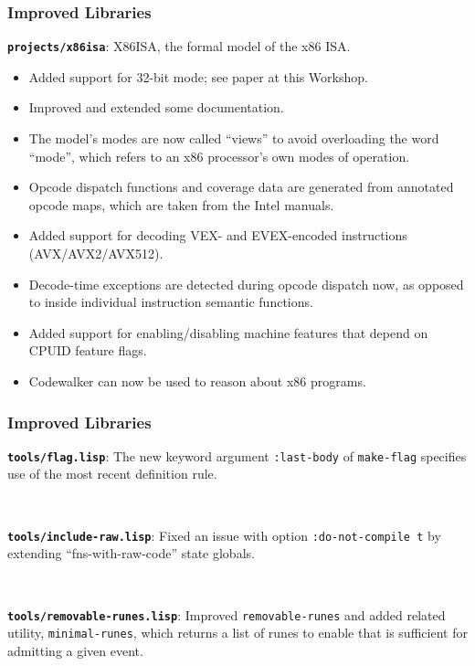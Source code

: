 \documentclass{beamer}
\newcommand{\code}[1]{\texttt{#1}}
\newcommand{\bookpath}[1]{\textbf{\code{#1}}}
\newcommand{\implibtitle}{\frametitle{Improved Libraries}}
\begin{document}
\begin{frame}

\implibtitle

\bookpath{projects/x86isa}:
X86ISA, the formal model of the x86 ISA.
\begin{itemize}
\item
Added support for 32-bit mode; see paper at this Workshop.
\item
Improved and extended some documentation.
\item
The model's modes are now called ``views'' to avoid overloading the
word ``mode'', which refers to an x86 processor's own modes of
operation.
\item
Opcode dispatch functions and coverage data are generated from
annotated opcode maps, which are taken from the Intel manuals.
\item
Added support for decoding VEX- and EVEX-encoded instructions
(AVX/AVX2/AVX512).
\item
Decode-time exceptions are detected during opcode dispatch now, as
opposed to inside individual instruction semantic functions.
\item
Added support for enabling/disabling machine features that depend on
CPUID feature flags.
\item
Codewalker can now be used to reason about x86 programs.
\end{itemize}

\end{frame}


\begin{frame}

\implibtitle

\bookpath{tools/flag.lisp}:
The new keyword argument \code{:last-body} of \code{make-flag}
specifies use of the most recent definition rule.

\

\bookpath{tools/include-raw.lisp}:
Fixed an issue with option \code{:do-not-compile t} by extending
``fns-with-raw-code'' state globals.

\

\bookpath{tools/removable-runes.lisp}:
Improved \code{removable-runes} and added related utility,
\code{minimal-runes}, which returns a list of runes to enable that is
sufficient for admitting a given event.

\end{frame}
\end{document}
